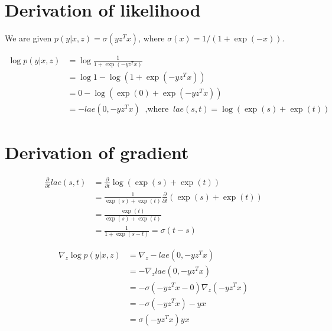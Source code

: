 \documentclass[11pt]{article}
\newcommand{\derivative}[2]{\frac{\partial #1}{\partial #2}}
\begin{document}
\date{\today}
\author{Sanchit Nevgi}

\section{Derivation of likelihood}

We are given $p(y | x, z) = \sigma(y z^T x)$, where $\sigma(x) = 1 / (1 + \exp(-x))$.

\begin{equation}
    \begin{aligned}
        \log p(y | x, z) & = \log \frac{1}{1 + \exp(-y z^T x)}                                              \\
                         & = \log 1 - \log (1 + \exp(-y z^T x))                                             \\
                         & = 0 - \log (\exp(0) + \exp(-y z^T x))                                            \\
                         & = - lae(0, -y z^T x) \;\; \text{,where} \;\; lae(s, t) = \log(\exp(s) + \exp(t))
    \end{aligned}
\end{equation}

\section{Derivation of gradient}

\begin{equation}
    \begin{aligned}
        \derivative{}{t} lae(s, t) & = \derivative{}{t} \log(\exp(s) + \exp(t))                         \\
                                   & = \frac{1}{\exp(s) + \exp(t)} \derivative{}{t} (\exp(s) + \exp(t)) \\
                                   & = \frac{\exp(t)}{\exp(s) + \exp(t)}                                \\
                                   & = \frac{1}{1 + \exp(s - t)} = \sigma(t - s)
    \end{aligned}
\end{equation}

\begin{equation}
    \begin{aligned}
        \nabla_z \log p (y|x,z) & = \nabla_z -lae(0, -yz^Tx)                  \\
                                & = - \nabla_z lae(0, -yz^Tx)                 \\
                                & = - \sigma(-yz^Tx - 0) \nabla_z (- y z^T x) \\
                                & = - \sigma(-yz^Tx) -yx                      \\
                                & = \sigma(-yz^Tx) yx
    \end{aligned}
\end{equation}
\end{document}
